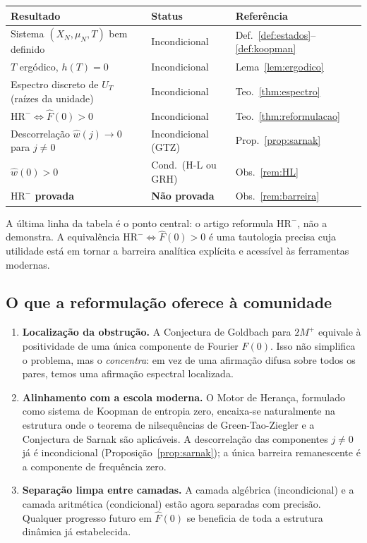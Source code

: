 \documentclass[12pt,a4paper]{article}
\theoremstyle{definition}
\newcommand{\HRm}{\mathrm{HR}^{-}}
\begin{document}
	\begin{center}
		\renewcommand{\arraystretch}{1.4}
		\begin{tabular}{lll}
			\toprule
			\textbf{Resultado} & \textbf{Status} & \textbf{Referência} \\
			\midrule
			Sistema $(X_N,\mu_N,T)$ bem definido & Incondicional & Def.~\ref{def:estados}--\ref{def:koopman} \\
			$T$ ergódico, $h(T) = 0$ & Incondicional & Lema~\ref{lem:ergodico} \\
			Espectro discreto de $U_T$ (raízes da unidade) & Incondicional & Teo.~\ref{thm:espectro} \\
			$\HRm \Leftrightarrow \widehat{F}(0) > 0$ & Incondicional & Teo.~\ref{thm:reformulacao} \\
			Descorrelação $\widehat{w}(j) \to 0$ para $j \neq 0$ & Incondicional (GTZ) & Prop.~\ref{prop:sarnak} \\
			$\widehat{w}(0) > 0$ & Cond.\ (H-L ou GRH) & Obs.~\ref{rem:HL} \\
			\midrule
			\textbf{$\HRm$ provada} & \textbf{Não provada} & Obs.~\ref{rem:barreira} \\
			\bottomrule
		\end{tabular}
	\end{center}
	
	A última linha da tabela é o ponto central: o artigo reformula $\HRm$,
	não a demonstra. A equivalência $\HRm \Leftrightarrow \widehat{F}(0) > 0$
	é uma tautologia precisa cuja utilidade está em tornar a barreira analítica
	explícita e acessível às ferramentas modernas.
	
	\subsection{O que a reformulação oferece à comunidade}
	
	\begin{enumerate}
		\item \textbf{Localização da obstrução.} A Conjectura de Goldbach para
		$2M^+$ equivale à positividade de uma única componente de Fourier
		$\widehat{F}(0)$. Isso não simplifica o problema, mas o
		\emph{concentra}: em vez de uma afirmação difusa sobre todos os pares,
		temos uma afirmação espectral localizada.
		
		\item \textbf{Alinhamento com a escola moderna.} O Motor de Herança,
		formulado como sistema de Koopman de entropia zero, encaixa-se
		naturalmente na estrutura onde o teorema de nilsequências de
		Green-Tao-Ziegler e a Conjectura de Sarnak são aplicáveis.
		A descorrelação das componentes $j \neq 0$ já é incondicional
		(Proposição~\ref{prop:sarnak}); a única barreira remanescente
		é a componente de frequência zero.
		
		\item \textbf{Separação limpa entre camadas.} A camada algébrica
		(incondicional) e a camada aritmética (condicional) estão agora
		separadas com precisão. Qualquer progresso futuro em $\widehat{F}(0)$
		se beneficia de toda a estrutura dinâmica já estabelecida.
	\end{enumerate}
	
\end{document}
